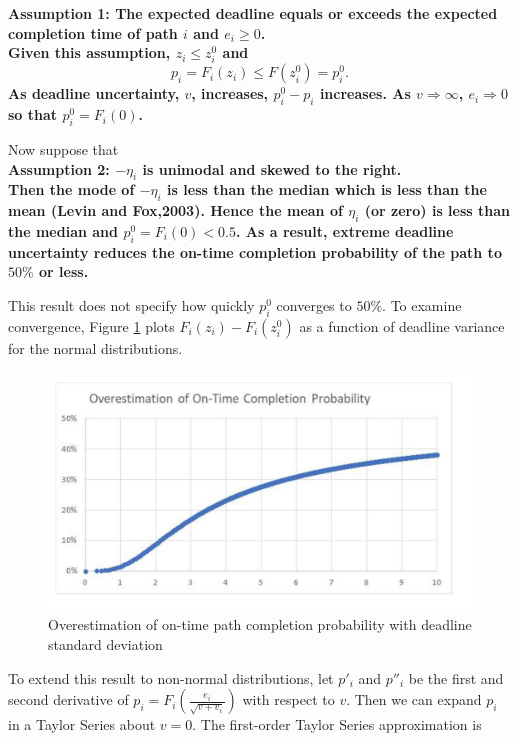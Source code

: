\documentclass[11pt]{article}
\begin{document}
\bf Assumption 1: \rm The expected deadline equals or exceeds the expected completion time of path $i$ and $e_i \geq 0$. \\ 
Given this assumption,   $z_i \leq z^0_i$ and $$p_i=F_i(z_i) \leq F(z^0_i)=p^0_i.$$ 
As deadline uncertainty, $v$, increases, $p^0_i-p_i$ increases. As $v \Longrightarrow \infty$, $e_i \Longrightarrow 0$ so that $p^0_i = F_i(0)$.  \par
Now suppose that \\
\bf Assumption 2: $-\eta_i$ is unimodal and skewed to the right.\\
\rm Then the mode of $-\eta_i$ is less than the median which is less than the mean (Levin and Fox,2003).  Hence the mean of $\eta_i$ (or zero) is less than the median and $p^0_i=F_i(0)< 0.5$. As a result, extreme deadline uncertainty reduces the on-time completion probability of the path to $50\%$ or less.\par
This result does not specify how quickly $p^0_i$ converges to $50\%$.  To examine convergence, Figure \ref{fig:overestimate} plots $F_i(z_i)-F_i(z^0_i)$ as a function of deadline variance for the normal distributions.
\begin{figure}[ht]
\begin{center}
\includegraphics[scale=0.30]{projectmanagementdeadlineuncertaintyoverestimation.pdf}
\caption{Overestimation of on-time path completion probability with deadline standard deviation}
\label{fig:overestimate}
\end{center}
\end{figure}
To extend this result to non-normal distributions, let $p'_i$ and $p''_i$ be the first and second derivative of $p_i=F_i(\frac{e_i}{\sqrt{v+v_i}}) $ with respect to $v$.  Then we can expand $p_i$ in a Taylor Series about $v=0$.  The first-order Taylor Series approximation is
\end{document}
